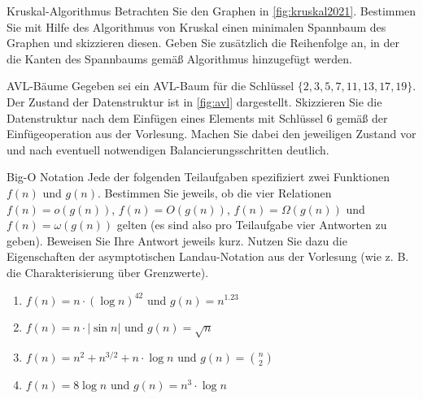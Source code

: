 \documentclass{article}
\begin{document}
\begin{exercise}{Kruskal-Algorithmus}
  Betrachten Sie den Graphen in \ref{fig:kruskal2021}. Bestimmen Sie mit Hilfe des Algorithmus von Kruskal einen minimalen Spannbaum des Graphen und skizzieren diesen. Geben Sie zusätzlich die Reihenfolge an, in der die Kanten des Spannbaums gemäß Algorithmus hinzugefügt werden.
  

  \begin{solution}

  \end{solution}
\end{exercise}

\begin{exercise}{AVL-Bäume}
  Gegeben sei ein AVL-Baum für die Schlüssel $\{2,3,5,7,11,13,17,19\}$. Der Zustand der Datenstruktur ist in \ref{fig:avl} dargestellt. Skizzieren Sie die Datenstruktur nach dem Einfügen eines Elements mit Schlüssel 6 gemäß der Einfügeoperation aus der Vorlesung. Machen Sie dabei den jeweiligen Zustand vor und nach eventuell notwendigen Balancierungsschritten deutlich.
  

  \begin{solution}

  \end{solution}
\end{exercise}

\begin{exercise}{Big-O Notation}
  Jede der folgenden Teilaufgaben spezifiziert zwei Funktionen $f(n)$ und $g(n)$. Bestimmen Sie jeweils, ob die vier Relationen $f(n) = o(g(n))$, $f(n) = O(g(n))$, $f(n) = \Omega(g(n))$ und $f(n) = \omega(g(n))$ gelten (es sind also pro Teilaufgabe vier Antworten zu geben). Beweisen Sie Ihre Antwort jeweils kurz. Nutzen Sie dazu die Eigenschaften der asymptotischen Landau-Notation aus der Vorlesung (wie z. B. die Charakterisierung über Grenzwerte).
  \begin{enumerate}
    \item $f(n) = n \cdot (\log n)^{42}$ und $g(n) = n^{1.23}$
    \item $f(n) = n \cdot |\sin n|$ und $g(n) = \sqrt{n}$
    \item $f(n) = n^2 + n^{3/2} + n \cdot \log n$ und $g(n) = \binom{n}{2}$
    \item $f(n) = 8 \log n$ und $g(n) = n^3 \cdot \log n$
  \end{enumerate}

  \begin{solution}

  \end{solution}
\end{exercise}
\end{document}
